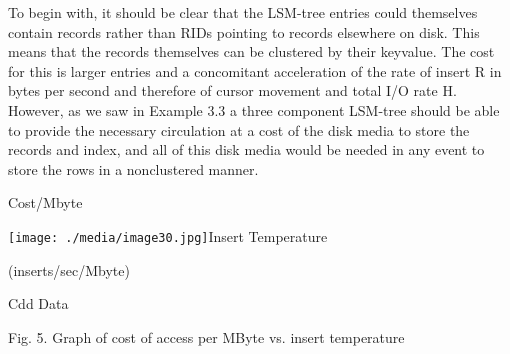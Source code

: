 \documentclass[a4paper,11pt,notitlepage,twoside,openright]{article}
\begin{document}
To begin with, it should be clear that the LSM-tree entries could
themselves contain records rather than RIDs pointing to records
elsewhere on disk. This means that the records themselves can be
clustered by their keyvalue. The cost for this is larger entries and a
concomitant acceleration of the rate of insert R in bytes per second and
therefore of cursor movement and total I/O rate H. However, as we saw in
Example 3.3 a three component LSM-tree should be able to provide the
necessary circulation at a cost of the disk media to store the records
and index, and all of this disk media would be needed in any event to
store the rows in a nonclustered manner.

Cost/Mbyte

\texttt{[image: ./media/image30.jpg]}Insert
Temperature

(inserts/sec/Mbyte)

Cdd Data

Fig. 5. Graph of cost of access per MByte vs. insert temperature
\end{document}
